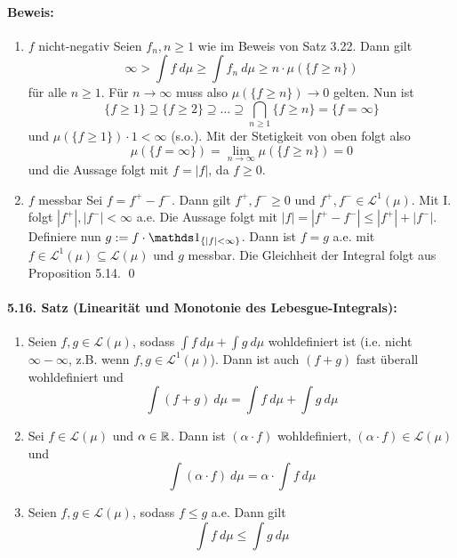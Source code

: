   \paragraph{Beweis:}
  \begin{enumerate}[label=\Roman*.]
      \item $f$ nicht-negativ\newline
      Seien $f_n,n\geq1$ wie im Beweis von Satz 3.22. Dann gilt
      $$\infty>\int f\ d\mu\geq\int f_n\ d\mu\geq n\cdot\mu(\{f\geq n\})$$
      f\"ur alle $n\geq1$. F\"ur $n\to\infty$ muss also $\mu(\{f\geq n\})\to0$ gelten. Nun ist
      $$\{f\geq1\}\supseteq\{f\geq2\}\supseteq\hdots\supseteq\bigcap_{n\geq1}\{f\geq n\}=\{f=\infty\}$$
      und $\mu(\{f\geq1\})\cdot 1<\infty$ (s.o.). Mit der Stetigkeit von oben folgt also 
      $$\mu(\{f=\infty\})=\lim_{n\to\infty}\mu(\{f\geq n\})=0$$
      und die Aussage folgt mit $f=|f|$, da $f\geq 0$.
      \item $f$ messbar\newline
      Sei $f=f^+-f^-$. Dann gilt $f^+,f^-\geq0$ und $f^+,f^-\in\mathcal{L}^1(\mu)$. Mit I. folgt $|f^+|,|f^-|<\infty$ a.e. Die Aussage folgt mit $|f|=|f^+-f^-|\leq|f^+|+|f^-|$. Definiere nun $g:=f\cdot\ind{\{|f|<\infty\}}$. Dann ist $f=g$ a.e. mit $f\in\mathcal{L}^1(\mu)\subseteq\mathcal{L}(\mu)$ und $g$ messbar. Die Gleichheit der Integral folgt aus Proposition 5.14. \qed
  \end{enumerate}
  
  \paragraph{5.16. Satz (Linearit\"at und Monotonie des Lebesgue-Integrals):}
  \begin{enumerate}[label=(\roman*)]
      \item Seien $f,g\in\mathcal{L}(\mu)$, sodass $\int f\ d\mu+\int g\ d\mu$ wohldefiniert ist (i.e. nicht $\infty-\infty$, z.B. wenn $f,g\in\mathcal{L}^1(\mu)$). Dann ist auch $(f+g)$ fast \"uberall wohldefiniert und 
      $$\int(f+g)\ d\mu=\int f\ d\mu+\int g\ d\mu$$
      \item Sei $f\in\mathcal{L}(\mu)$ und $\alpha\in\mathbb{R}$. Dann ist $(\alpha\cdot f)$ wohldefiniert, $(\alpha\cdot f)\in\mathcal{L}(\mu)$ und 
      $$\int (\alpha\cdot f)\ d\mu=\alpha\cdot\int f\ d\mu$$
      \item Seien $f,g\in\mathcal{L}(\mu)$, sodass $f\leq g$ a.e. Dann gilt
      $$\int f\ d\mu\leq\int g\ d\mu$$
  \end{enumerate}
 
